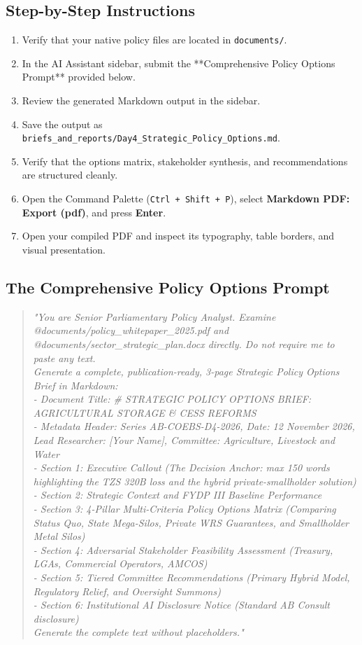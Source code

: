 \documentclass[11pt, a4paper]{report}
\begin{document}
\subsection{Step-by-Step Instructions}
\begin{enumerate}[label=\textbf{Step \arabic*:}]
    \item Verify that your native policy files are located in \texttt{documents/}.
    \item In the AI Assistant sidebar, submit the **Comprehensive Policy Options Prompt** provided below.
    \item Review the generated Markdown output in the sidebar.
    \item Save the output as \texttt{briefs\_and\_reports/Day4\_Strategic\_Policy\_Options.md}.
    \item Verify that the options matrix, stakeholder synthesis, and recommendations are structured cleanly.
    \item Open the Command Palette (\texttt{Ctrl + Shift + P}), select \textbf{Markdown PDF: Export (pdf)}, and press \textbf{Enter}.
    \item Open your compiled PDF and inspect its typography, table borders, and visual presentation.
\end{enumerate}

\subsection{The Comprehensive Policy Options Prompt}
\begin{quote}
\small
\textit{"You are Senior Parliamentary Policy Analyst. Examine @documents/policy\_whitepaper\_2025.pdf and @documents/sector\_strategic\_plan.docx directly. Do not require me to paste any text. \\
Generate a complete, publication-ready, 3-page Strategic Policy Options Brief in Markdown: \\
- Document Title: \# STRATEGIC POLICY OPTIONS BRIEF: AGRICULTURAL STORAGE \& CESS REFORMS \\
- Metadata Header: Series AB-COEBS-D4-2026, Date: 12 November 2026, Lead Researcher: [Your Name], Committee: Agriculture, Livestock and Water \\
- Section 1: Executive Callout (The Decision Anchor: max 150 words highlighting the TZS 320B loss and the hybrid private-smallholder solution) \\
- Section 2: Strategic Context and FYDP III Baseline Performance \\
- Section 3: 4-Pillar Multi-Criteria Policy Options Matrix (Comparing Status Quo, State Mega-Silos, Private WRS Guarantees, and Smallholder Metal Silos) \\
- Section 4: Adversarial Stakeholder Feasibility Assessment (Treasury, LGAs, Commercial Operators, AMCOS) \\
- Section 5: Tiered Committee Recommendations (Primary Hybrid Model, Regulatory Relief, and Oversight Summons) \\
- Section 6: Institutional AI Disclosure Notice (Standard AB Consult disclosure) \\
Generate the complete text without placeholders."}
\end{quote}
\end{document}
